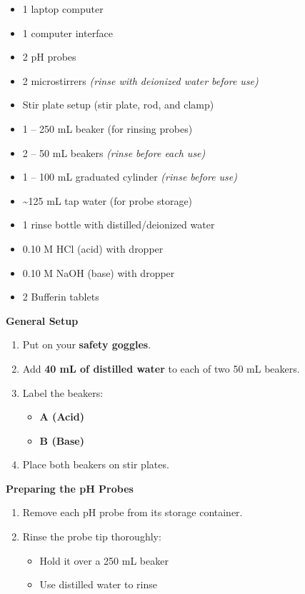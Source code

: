 \documentclass[
  letterpaper,
  DIV=11,
  numbers=noendperiod]{scrreprt}
\begin{document}
\begin{itemize}
\item
  1 laptop computer
\item
  1 computer interface
\item
  2 pH probes
\item
  2 microstirrers \emph{(rinse with deionized water before use)}
\item
  Stir plate setup (stir plate, rod, and clamp)
\item
  1 -- 250 mL beaker (for rinsing probes)
\item
  2 -- 50 mL beakers \emph{(rinse before each use)}
\item
  1 -- 100 mL graduated cylinder \emph{(rinse before use)}
\item
  \textasciitilde125 mL tap water (for probe storage)
\item
  1 rinse bottle with distilled/deionized water
\item
  0.10 M HCl (acid) with dropper
\item
  0.10 M NaOH (base) with dropper
\item
  2 Bufferin tablets
\end{itemize}

\textbf{General Setup}

\begin{enumerate}
\def\labelenumi{\arabic{enumi}.}
\item
  Put on your \textbf{safety goggles}.
\item
  Add \textbf{40 mL of distilled water} to each of two 50 mL beakers.
\item
  Label the beakers:

  \begin{itemize}
  \item
    \textbf{A (Acid)}
  \item
    \textbf{B (Base)}
  \end{itemize}
\item
  Place both beakers on stir plates.
\end{enumerate}

\textbf{Preparing the pH Probes}

\begin{enumerate}
\def\labelenumi{\arabic{enumi}.}
\setcounter{enumi}{4}
\item
  Remove each pH probe from its storage container.
\item
  Rinse the probe tip thoroughly:

  \begin{itemize}
  \item
    Hold it over a 250 mL beaker
  \item
    Use distilled water to rinse
  \end{itemize}
\end{enumerate}
\end{document}
